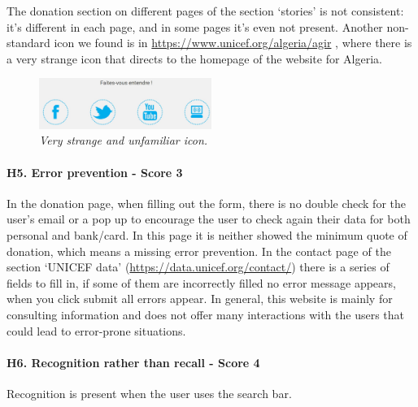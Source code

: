 \newline The donation section on different pages of the section ‘stories’ is not consistent: it’s different in each page, and in some pages it’s even not present.
\newline Another non-standard icon we found is in \href{https://www.unicef.org/algeria/agir}{https://www.unicef.org/algeria/agir} , where there is a very strange icon that directs to the homepage of the website for Algeria.
\begin{figure}[!h]
	\begin{center}
		\includegraphics[width=0.5\textwidth]{FinalScores11.jpg}
		\captionsetup{font=small}
		\caption{\textit{Very strange and unfamiliar icon.}}
	\end{center}
\end{figure}
\newline
\newline \paragraph{H5. Error prevention - Score 3}  \label{subsec:H5}	In the donation page, when filling out the form, there is no double check for the user's email or a pop up to encourage the user to check again their data for both personal and bank/card.
In this page it is neither showed the minimum quote of donation, which means a missing error prevention.
\newline In the contact page of the section ‘UNICEF data’ (\href {https://data.unicef.org/contact/}{https://data.unicef.org/contact/}) there is a series of fields to fill in, if some of them are incorrectly filled no error message appears, when you click submit all errors appear.
\newline In general, this website is mainly for consulting information and does not offer many interactions with the users that could lead to error-prone situations.
\newline
\newline \paragraph{H6. Recognition rather than recall - Score 4}  \label{subsec:H6}	Recognition is present when the user uses the search bar.
